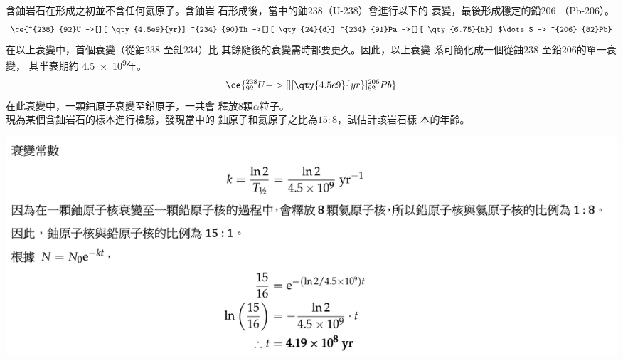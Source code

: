 {
    含鈾岩石在形成之初並不含任何氦原子。含鈾岩 石形成後，當中的鈾238（U-238）會進行以下的 衰變，最後形成穩定的鉛206 （Pb-206）。
    \begin{align*}
        \ce{^{238}_{92}U ->[][ \qty{4.5e9}{yr}] ^{234}_{90}Th ->[][ \qty{24}{d}] ^{234}_{91}Pa ->[][ \qty{6.75}{h}] $\dots$ -> ^{206}_{82}Pb}
    \end{align*}
    在以上衰變中，首個衰變（從鈾238 至釷234）比 其餘隨後的衰變需時都要更久。因此，以上衰變 系可簡化成一個從鈾238 至鉛206的單一衰變， 其半衰期約 \num{4.5e9}年。
    \begin{align*}
        \ce{^{238}_{92}U ->[][ \qty{4.5e9}{yr}]  ^{206}_{82}Pb}
    \end{align*}
    在此衰變中，一顆鈾原子衰變至鉛原子，一共會 釋放8顆$\alpha$粒子。 \\現為某個含鈾岩石的樣本進行檢驗，發現當中的 鈾原子和氦原子之比為$15:8$，試估計該岩石樣 本的年齡。
}{
    \par{\par\centering\includegraphics[width=\textwidth]{./img/ch2_decay_lq_2024-06-17-23-10-03.png}\par}
}


